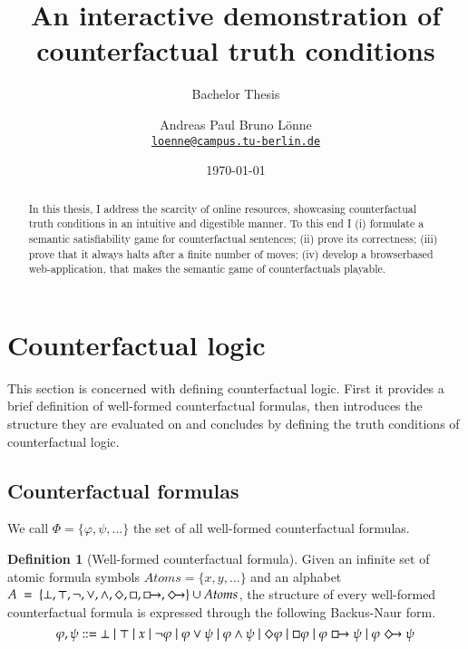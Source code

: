 \documentclass[a4paper,american]{paper}
\date{\today}
\providecommand*{\code}[1]{\texttt{#1}}
\theoremstyle{definition}\newtheorem{definition}{Definition}
\begin{document}
\title{An interactive demonstration of counterfactual truth conditions}

\subtitle{Bachelor Thesis}

\author{%
	Andreas Paul Bruno Lönne\\
	\code{\href{mailto:loenne@campus.tu-berlin.de}{loenne@campus.tu-berlin.de}}
}


\maketitle

\begin{abstract}
In this thesis, I address the scarcity of online resources, showcasing counterfactual truth conditions in an intuitive and digestible manner. To this end I (i) formulate a semantic satisfiability game for counterfactual sentences; (ii) prove its correctness; (iii) prove that it always halts after a finite number of moves; (iv) develop a browserbased web-application, that makes the semantic game of counterfactuals playable.
\end{abstract}
\section{Counterfactual logic}
This section is concerned with defining counterfactual logic. First it provides a brief definition of well-formed counterfactual formulas, then introduces the structure they are evaluated on and concludes by defining the truth conditions of counterfactual logic.

\subsection{Counterfactual formulas}
We call $\Phi = \{\varphi ,\psi ,...\}$ the set of all well-formed counterfactual formulas.
\begin{definition}[Well-formed counterfactual formula]
Given an infinite set of atomic formula symbols $Atoms = \{ x, y, ...\}$ and an alphabet $A~=~\{\bot ,\top ,\neg ,\vee ,\wedge ,\Diamond ,\Box ,\boxright ,\Diamondright\}\cup Atoms$, the structure of every well-formed counterfactual formula is expressed through the following Backus-Naur form.
\begin{equation}
\varphi, \psi ::= \bot \mid \top \mid x \mid \neg \varphi \mid \varphi \vee \psi \mid \varphi \wedge \psi \mid \Diamond \varphi \mid \Box \varphi \mid \varphi \boxright \psi \mid \varphi \Diamondright \psi
\end{equation}
\end{definition}
\end{document}
